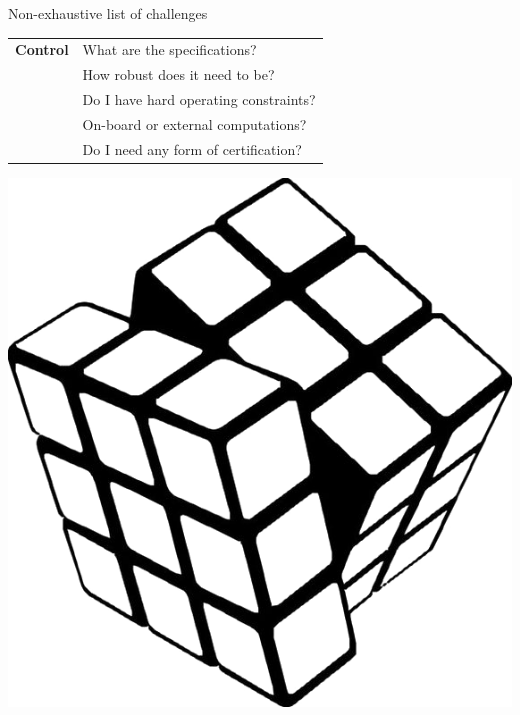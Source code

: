 \documentclass[aspectratio=169,compress,12pt,dvipsnames]{beamer}
\begin{document}
\begin{frame}[t, c]{Non-exhaustive list of challenges}
    \vfill
    \begin{minipage}{.68\textwidth}
        \centering
        \begin{tabular}{rl}
            \textbf{Control}    &   What are the specifications?            \\
                                &   How robust does it need to be?          \\
                                &   Do I have hard operating constraints?   \\
                                &   On-board or external computations?      \\
                                &   Do I need any form of certification?
        \end{tabular}
    \end{minipage}%
    \hfill
    \begin{minipage}{.28\textwidth}
        \centering
        \includegraphics[width=\textwidth]{rubik_cube.png}
    \end{minipage}
    \vfill
\end{frame}
\end{document}
